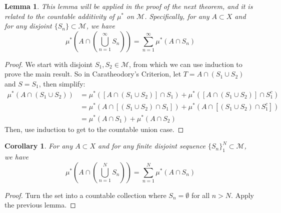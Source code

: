 \documentclass[12pt]{article}
\theoremstyle{plain}
\newtheorem{lem}[thm]{Lemma}
\newtheorem{cor}[thm]{Corollary}
\theoremstyle{definition}
\theoremstyle{remark}
\begin{document}
\begin{lem}
\label{caralem}
This lemma will be applied in the proof of the next theorem, and it is related to the countable additivity of $\mu^*$ on $\mathscr{M}$. Specifically, for any $A\subset X$ and for any disjoint $\{S_n\}\subset\mathscr{M}$, we have
\[
    \mu^*\left(A \cap \left(
    \bigcup^\infty_{n=1}S_n\right)\right) = 
    \sum^\infty_{n=1}\mu^*(A\cap S_n)
\]
\end{lem}
\begin{proof}
We start with disjoint $S_1,S_2\in\mathscr{M}$, from which we can use induction to prove the main result. So in Caratheodory's Criterion, let $T=A \cap(S_1\cup S_2)$ and $S=S_1$, then simplify:
\begin{align*}
    \mu^*(A\cap(S_1\cup S_2)) &= 
    \mu^*\left([A\cap(S_1\cup S_2)] \cap S_1\right)
    + \mu^*\left([A\cap(S_1\cup S_2)] \cap S^c_1\right) \\
    &= \mu^*\left(A\cap[(S_1\cup S_2) \cap S_1]\right)
    + \mu^*\left(A\cap[(S_1\cup S_2) \cap S^c_1]\right) \\
    &= \mu^*\left(A\cap S_1 \right)
    + \mu^*\left(A\cap S_2\right) 
\end{align*}
Then, use induction to get to the countable union case.
\end{proof}
\begin{cor}
For any $A\subset X$ and for any finite disjoint sequence $\{S_n\}_1^N\subset\mathscr{M}$, we have
\[
    \mu^*\left(A \cap \left(
    \bigcup^N_{n=1}S_n\right)\right) = 
    \sum^N_{n=1}\mu^*(A\cap S_n)
\]
\end{cor}
\begin{proof}
Turn the set into a countable collection where $S_n = \emptyset$ for all $n>N$. Apply the previous lemma.
\end{proof}
\end{document}
